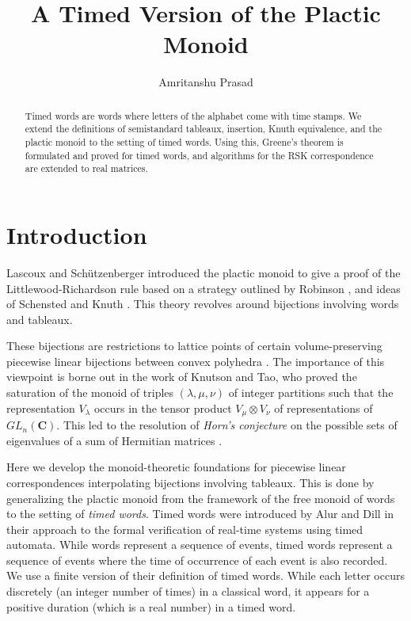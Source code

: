 \documentclass[10pt]{amsproc}
\title{A Timed Version of the Plactic Monoid}
\author{Amritanshu Prasad}
\theoremstyle{definition}
\theoremstyle{remark}
\begin{document}
\begin{abstract}
  Timed words are words where letters of the alphabet come with time stamps.
  We extend the definitions of semistandard tableaux, insertion, Knuth equivalence, and the plactic monoid to the setting of timed words.
  Using this, Greene's theorem is formulated and proved for timed words, and algorithms for the RSK correspondence are extended to real matrices.
\end{abstract}
\maketitle
\section{Introduction}
Lascoux and Sch\"utzenberger \cite{plaxique} introduced the plactic monoid to give a proof of the Littlewood-Richardson rule based on a strategy outlined by Robinson \cite{robinson-algo}, and ideas of Schensted \cite{schensted} and Knuth \cite{knuth}.
This theory revolves around bijections involving words and tableaux.

These bijections are restrictions to lattice points of certain volume-preserving piecewise linear bijections between convex polyhedra \cite{berkir,kir-trop,DeLoera2004,pak}.
The importance of this viewpoint is borne out in the work of Knutson and Tao, who proved the saturation of the monoid of triples $(\lambda, \mu, \nu)$ of integer partitions such that the representation $V_\lambda$ occurs in the tensor product $V_\mu\otimes V_\nu$ of representations of $GL_n(\mathbf C)$.
This led to the resolution of \emph{Horn's conjecture} on the possible sets of eigenvalues of a sum of Hermitian matrices \cite{knutsontaojams,knutsontaonotices}.

Here we develop the monoid-theoretic foundations for piecewise linear correspondences interpolating bijections involving tableaux.
This is done by generalizing the plactic monoid from the framework of the free monoid of words to the setting of \emph{timed words}.
Timed words were introduced by Alur and Dill \cite{alur-dill} in their approach to the formal verification of real-time systems using timed automata.
While words represent a sequence of events, timed words represent a sequence of events where the time of occurrence of each event is also recorded.
We use a finite version of their definition of timed words.
While each letter occurs discretely (an integer number of times) in a classical word, it appears for a positive duration (which is a real number) in a timed word.
\end{document}
